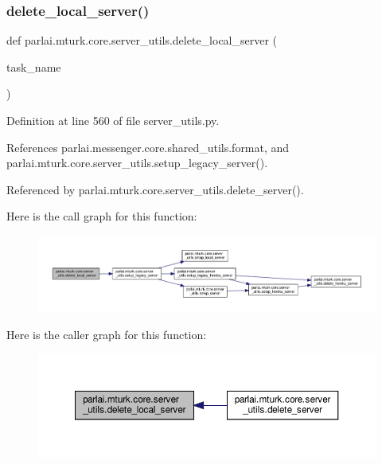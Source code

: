 \subsubsection{\texorpdfstring{delete\+\_\+local\+\_\+server()}{delete\_local\_server()}}
{\footnotesize\ttfamily def parlai.\+mturk.\+core.\+server\+\_\+utils.\+delete\+\_\+local\+\_\+server (\begin{DoxyParamCaption}\item[{}]{task\+\_\+name }\end{DoxyParamCaption})}



Definition at line 560 of file server\+\_\+utils.\+py.



References parlai.\+messenger.\+core.\+shared\+\_\+utils.\+format, and parlai.\+mturk.\+core.\+server\+\_\+utils.\+setup\+\_\+legacy\+\_\+server().



Referenced by parlai.\+mturk.\+core.\+server\+\_\+utils.\+delete\+\_\+server().

Here is the call graph for this function\+:
\nopagebreak
\begin{figure}[H]
\begin{center}
\leavevmode
\includegraphics[width=350pt]{namespaceparlai_1_1mturk_1_1core_1_1server__utils_a9b4f4c3f696be001c2fa96b3690af83c_cgraph}
\end{center}
\end{figure}
Here is the caller graph for this function\+:
\nopagebreak
\begin{figure}[H]
\begin{center}
\leavevmode
\includegraphics[width=350pt]{namespaceparlai_1_1mturk_1_1core_1_1server__utils_a9b4f4c3f696be001c2fa96b3690af83c_icgraph}
\end{center}
\end{figure}
\mbox{\label{namespaceparlai_1_1mturk_1_1core_1_1server__utils_a3c7c1d82bd4d26eb98ce9711de3cca7c}} 
